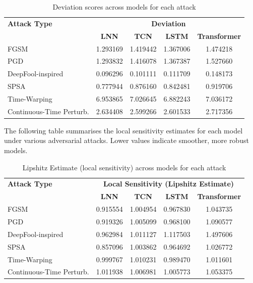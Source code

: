 \begin{table}[H]
    \centering
    \small
    \begin{tabular}{|l|cccc|}
    \hline
    \textbf{Attack Type} & \multicolumn{4}{c|}{\textbf{Deviation}} \\
    \cline{2-5}
     & \textbf{LNN} & \textbf{TCN} & \textbf{LSTM} & \textbf{Transformer} \\
    \hline
    FGSM                     & 1.293169 & 1.419442 & 1.367006 & 1.474218 \\
    PGD                      & 1.293832 & 1.416078 & 1.367387 & 1.527660 \\
    DeepFool-inspired        & 0.096296 & 0.101111 & 0.111709 & 0.148173 \\
    SPSA                     & 0.777944 & 0.876160 & 0.842481 & 0.919706 \\
    Time-Warping             & 6.953865 & 7.026645 & 6.882243 & 7.036172 \\
    Continuous-Time Perturb. & 2.634408 & 2.599266 & 2.601533 & 2.717356 \\
    \hline
    \end{tabular}
    \caption{Deviation scores across models for each attack}
    \label{tab:attack_results_deviation}
\end{table}

The following table summarises the local sensitivity estimates for each model under various adversarial attacks. Lower values indicate smoother, more robust models.

\begin{table}[H]
    \centering
    \small
    \begin{tabular}{|l|cccc|}
    \hline
    \textbf{Attack Type} & \multicolumn{4}{c|}{\textbf{Local Sensitivity (Lipshitz Estimate)}} \\
    \cline{2-5}
     & \textbf{LNN} & \textbf{TCN} & \textbf{LSTM} & \textbf{Transformer} \\
    \hline
    FGSM                     & 0.915554 & 1.004954 & 0.967830 & 1.043735 \\
    PGD                      & 0.919326 & 1.005099 & 0.968100 & 1.090577 \\
    DeepFool-inspired        & 0.962984 & 1.011127 & 1.117503 & 1.497606 \\
    SPSA                     & 0.857096 & 1.003862 & 0.964692 & 1.026772 \\
    Time-Warping             & 0.999767 & 1.010231 & 0.989470 & 1.011601 \\
    Continuous-Time Perturb. & 1.011938 & 1.006981 & 1.005773 & 1.053375 \\
    \hline
    \end{tabular}
    \caption{Lipshitz Estimate (local sensitivity) across models for each attack}
    \label{tab:attack_results_sensitivity}
\end{table}

